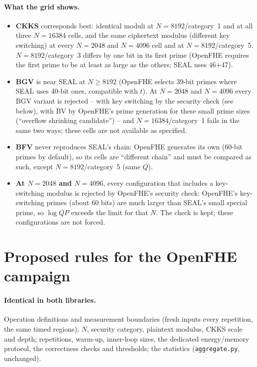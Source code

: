 \documentclass[11pt]{article}
\begin{document}
\paragraph{What the grid shows.}
\begin{itemize}[leftmargin=*, itemsep=2pt]
  \item \textbf{CKKS} corresponds best: identical moduli at $N{=}8192$/category~1 and at all three $N{=}16384$ cells, and the same ciphertext modulus (different key switching) at every $N{=}2048$ and $N{=}4096$ cell and at $N{=}8192$/category~5. $N{=}8192$/category~3 differs by one bit in its first prime (OpenFHE requires the first prime to be at least as large as the others; SEAL uses 46+47).
  \item \textbf{BGV} is near SEAL at $N \ge 8192$ (OpenFHE selects 39-bit primes where SEAL uses 40-bit ones, compatible with $t$). At $N{=}2048$ and $N{=}4096$ every BGV variant is rejected -- with key switching by the security check (see below), with BV by OpenFHE's prime generation for these small prime sizes (``overflow shrinking candidate'') -- and $N{=}16384$/category~1 fails in the same two ways; these cells are not available as specified.
  \item \textbf{BFV} never reproduces SEAL's chain: OpenFHE generates its own (60-bit primes by default), so its cells are ``different chain'' and must be compared as such, except $N{=}8192$/category~5 (same $Q$).
  \item \textbf{At $N{=}2048$ and $N{=}4096$}, every configuration that includes a key-switching modulus is rejected by OpenFHE's security check: OpenFHE's key-switching primes (about 60 bits) are much larger than SEAL's small special prime, so $\log QP$ exceeds the limit for that $N$. The check is kept; these configurations are not forced.
\end{itemize}

\section{Proposed rules for the OpenFHE campaign}

\paragraph{Identical in both libraries.} Operation definitions and measurement boundaries (fresh inputs every repetition, the same timed regions); $N$, security category, plaintext modulus, CKKS scale and depth; repetitions, warm-up, inner-loop sizes, the dedicated energy/memory protocol, the correctness checks and thresholds; the statistics (\texttt{aggregate.py}, unchanged).
\end{document}
